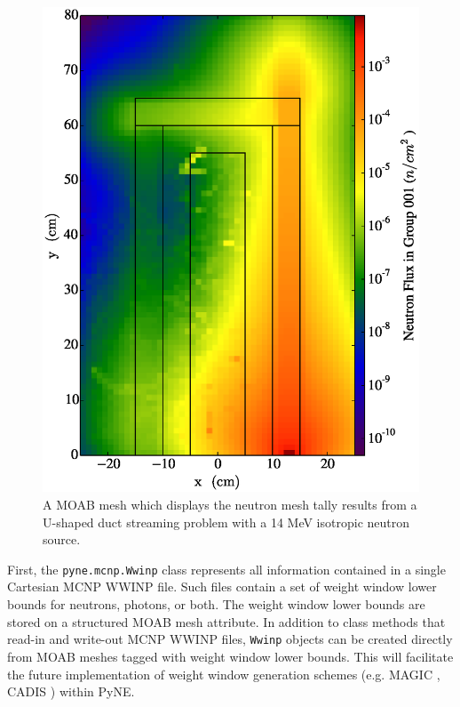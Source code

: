 \documentclass{ansconf}
\begin{document}
\begin{figure}[htbp]
\begin{center}
\includegraphics[scale=0.35]{moab_example.eps}
\end{center}
\caption{A MOAB mesh which displays the neutron mesh tally results from a U-shaped 
         duct streaming problem with a 14 MeV isotropic neutron source.}
\label{moabexp}
\end{figure}

First, the \texttt{pyne.mcnp.Wwinp} class represents all information contained in a
single Cartesian MCNP WWINP file.   Such files contain a set of weight window lower
bounds for neutrons, photons, or both. The weight window lower bounds are
stored on a structured MOAB mesh attribute. In addition to class methods that
read-in and write-out MCNP WWINP files, \texttt{Wwinp} objects can be created
directly from MOAB meshes tagged with weight window lower bounds. This will
facilitate the future implementation of weight window generation schemes (e.g.
MAGIC \cite{davis_comparison_2011}, CADIS \cite{haghighat_monte_2003}) within
PyNE.
\end{document}
